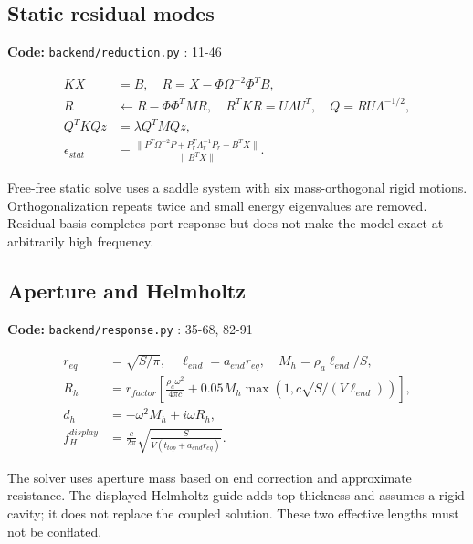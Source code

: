\documentclass[10pt,a4paper]{article}
\newcommand{\loc}[1]{{\small\color{ink}\textbf{Code:} #1\par}}
\begin{document}
\begin{samepage}\subsection{Static residual modes}
\loc{\texttt{backend/reduction.py} : 11-46}
\begin{align}K X&=B,\quad R=X-\Phi\Omega^{-2}\Phi^TB,\\
R&\leftarrow R-\Phi\Phi^TMR,\quad R^TKR=U\Lambda U^T,\quad Q=RU\Lambda^{-1/2},\\
Q^TKQz&=\lambda Q^TMQz,\\
\epsilon_{stat}&=\frac{\|P^T\Omega^{-2}P+P_r^T\Lambda_r^{-1}P_r-B^TX\|}{\|B^TX\|}.\end{align}

Free-free static solve uses a saddle system with six mass-orthogonal rigid motions. Orthogonalization repeats twice and small energy eigenvalues are removed. Residual basis completes port response but does not make the model exact at arbitrarily high frequency.\par
\end{samepage}
\begin{samepage}\subsection{Aperture and Helmholtz}
\loc{\texttt{backend/response.py} : 35-68, 82-91}
\begin{align}r_{eq}&=\sqrt{S/\pi},\quad\ell_{end}=a_{end}r_{eq},\quad M_h=\rho_a\ell_{end}/S,\\
R_h&=r_{factor}\left[\frac{\rho_a\omega^2}{4\pi c}+0.05M_h\max\left(1,c\sqrt{S/(V\ell_{end})}\right)\right],\\
d_h&=-\omega^2M_h+i\omega R_h,\\
f_H^{display}&=\frac{c}{2\pi}\sqrt{\frac S{V(t_{top}+a_{end}r_{eq})}}.\end{align}

The solver uses aperture mass based on end correction and approximate resistance. The displayed Helmholtz guide adds top thickness and assumes a rigid cavity; it does not replace the coupled solution. These two effective lengths must not be conflated.\par
\end{samepage}
\end{document}
